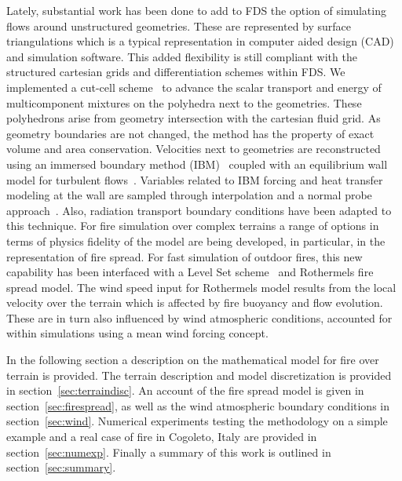 \documentclass[journal,article,atmosphere,submit,moreauthors,pdftex]{Definitions/mdpi}
\begin{document}
Lately, substantial work has been done to add to FDS the option of simulating flows around unstructured geometries. These are represented by surface triangulations which is a typical representation in computer aided design (CAD) and simulation software. This added flexibility is still compliant with the structured cartesian grids and differentiation schemes within FDS. We implemented a cut-cell scheme~\cite{berger_2016} to advance the scalar transport and energy of multicomponent mixtures on the polyhedra next to the geometries. These polyhedrons arise from geometry intersection with the cartesian fluid grid. As geometry boundaries are not changed, the method has the property of exact volume and area conservation. Velocities next to geometries are reconstructed using an immersed boundary method (IBM)~\cite{fadlun_2000,balaras_2004} coupled with an equilibrium wall model for turbulent flows~\cite{mcdermo_2018}. Variables related to IBM forcing and heat transfer modeling at the wall are sampled through interpolation and a normal probe approach~\cite{balaras_2004}. Also, radiation transport boundary conditions have been adapted to this technique.
For fire simulation over complex terrains a range of options in terms of physics fidelity of the model are being developed, in particular, in the representation of fire spread. For fast simulation of outdoor fires, this new capability has been interfaced with a Level Set scheme~\cite{Bova:IJWF2015} and Rothermels fire spread model. The wind speed input for Rothermels model results from the local velocity over the terrain which is affected by fire buoyancy and flow evolution. These are in turn also influenced by wind atmospheric conditions, accounted for within simulations using a mean wind forcing concept.

In the following section a description on the mathematical model for fire over terrain is provided. The terrain description and model discretization is provided in section~\ref{sec:terraindisc}. An account of the fire spread model is given in section~\ref{sec:firespread}, as well as the wind atmospheric boundary conditions in section~\ref{sec:wind}. Numerical experiments testing the methodology on a simple example and a real case of fire in Cogoleto, Italy are provided in section~\ref{sec:numexp}. Finally a summary of this work is outlined in section~\ref{sec:summary}.
\end{document}
